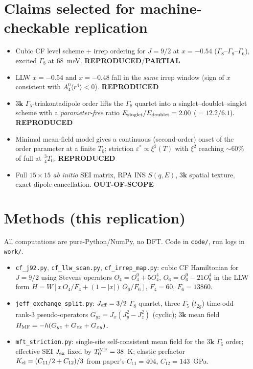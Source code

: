 \documentclass[11pt]{article}
\newcommand{\reprod}{\textcolor{green!55!black}{\textbf{REPRODUCED}}}
\newcommand{\partl}{\textcolor{orange!85!black}{\textbf{PARTIAL}}}
\newcommand{\oosc}{\textcolor{blue!70!black}{\textbf{OUT-OF-SCOPE}}}
\begin{document}
\section{Claims selected for machine-checkable replication}
\begin{itemize}
\item[C1.] Cubic CF level scheme + irrep ordering for $J=9/2$ at $x=-0.54$
($\Gamma_8$--$\Gamma_8$--$\Gamma_6$), excited $\Gamma_8$ at $68$~meV. \reprod/\partl
\item[C2.] LLW $x=-0.54$ and $x=-0.48$ fall in the \emph{same} irrep window
(sign of $x$ consistent with $A_4^0\langle r^4\rangle<0$). \reprod
\item[C3.] $3\mathbf{k}$ $\Gamma_5$-triakontadipole order lifts the $\Gamma_8$
quartet into a singlet--doublet--singlet scheme with a \emph{parameter-free}
ratio $E_{\rm singlet}/E_{\rm doublet}=2.00$ ($=12.2/6.1$). \reprod
\item[C4.] Minimal mean-field model gives a continuous (second-order) onset of
the order parameter at a finite $T_0$; striction $\varepsilon^*\propto\xi^2(T)$
with $\xi^2$ reaching $\sim60\%$ of full at $\tfrac34 T_0$. \reprod
\item[C5.] Full $15\times15$ \emph{ab initio} SEI matrix, RPA INS $S(q,E)$,
$3\mathbf{k}$ spatial texture, exact dipole cancellation. \oosc
\end{itemize}

\section{Methods (this replication)}
All computations are pure-Python/NumPy, no DFT. Code in \texttt{code/}, run logs
in \texttt{work/}.
\begin{itemize}
\item \texttt{cf\_j92.py}, \texttt{cf\_llw\_scan.py}, \texttt{cf\_irrep\_map.py}:
cubic CF Hamiltonian for $J=9/2$ using Stevens operators
$O_4=O_4^0+5O_4^4$, $O_6=O_6^0-21O_6^4$ in the LLW form
$H=W[x\,O_4/F_4+(1-|x|)\,O_6/F_6]$, $F_4=60$, $F_6=13860$.
\item \texttt{jeff\_exchange\_split.py}: $J_{\rm eff}=3/2$ $\Gamma_8$ quartet, three
$\Gamma_5$ ($t_{2g}$) time-odd rank-3 pseudo-operators
$G_{yz}=\overline{J_x(J_y^2-J_z^2)}$ (cyclic); $3\mathbf{k}$ mean field
$H_{\rm MF}=-h(G_{yz}+G_{zx}+G_{xy})$.
\item \texttt{mft\_striction.py}: single-site self-consistent mean field for the
$3\mathbf{k}$ $\Gamma_5$ order; effective SEI $J_{\rm ex}$ fixed by $T_0^{\rm MF}=38$~K;
elastic prefactor $K_{\rm el}=(C_{11}/2+C_{12})/3$ from paper's
$C_{11}=404$, $C_{12}=143$~GPa.
\end{itemize}
\end{document}

